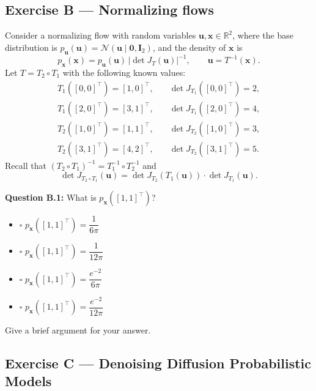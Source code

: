 \documentclass[12pt,a4paper]{article}
\newcommand{\N}{\mathcal{N}}
\begin{document}
\vspace{6cm}

\newpage
\subsection*{Exercise B --- Normalizing flows}

Consider a normalizing flow with random variables $\mathbf{u},\mathbf{x}\in\mathbb{R}^2$, where the
base distribution is $p_{\mathbf{u}}(\mathbf{u})=\N(\mathbf{u}\mid\mathbf{0},\mathbf{I}_2)$, and
the density of $\mathbf{x}$ is
\[
  p_{\mathbf{x}}(\mathbf{x}) = p_{\mathbf{u}}(\mathbf{u})\,|\det J_T(\mathbf{u})|^{-1},
  \qquad \mathbf{u} = T^{-1}(\mathbf{x}). \tag{4}
\]
Let $T = T_2\circ T_1$ with the following known values:
\begin{align*}
  T_1([0,0]^\top)=[1,0]^\top,\quad &\det J_{T_1}([0,0]^\top)=2,\\
  T_1([2,0]^\top)=[3,1]^\top,\quad &\det J_{T_1}([2,0]^\top)=4,\\
  T_2([1,0]^\top)=[1,1]^\top,\quad &\det J_{T_2}([1,0]^\top)=3,\\
  T_2([3,1]^\top)=[4,2]^\top,\quad &\det J_{T_2}([3,1]^\top)=5.
\end{align*}
Recall that $(T_2\circ T_1)^{-1}=T_1^{-1}\circ T_2^{-1}$ and
\[
  \det J_{T_2\circ T_1}(\mathbf{u}) = \det J_{T_2}(T_1(\mathbf{u}))\cdot\det J_{T_1}(\mathbf{u}). \tag{5}
\]

\textbf{Question B.1:} What is $p_{\mathbf{x}}([1,1]^\top)$?

\begin{itemize}[noitemsep,label={}]
  \item[\textbf{A}] $\square$ \quad $p_{\mathbf{x}}([1,1]^\top) = \dfrac{1}{6\pi}$
  \item[\textbf{B}] $\square$ \quad $p_{\mathbf{x}}([1,1]^\top) = \dfrac{1}{12\pi}$
  \item[\textbf{C}] $\square$ \quad $p_{\mathbf{x}}([1,1]^\top) = \dfrac{e^{-2}}{6\pi}$
  \item[\textbf{D}] $\square$ \quad $p_{\mathbf{x}}([1,1]^\top) = \dfrac{e^{-2}}{12\pi}$
\end{itemize}

Give a brief argument for your answer.

\vspace{8cm}

\newpage
\subsection*{Exercise C --- Denoising Diffusion Probabilistic Models}
\end{document}
